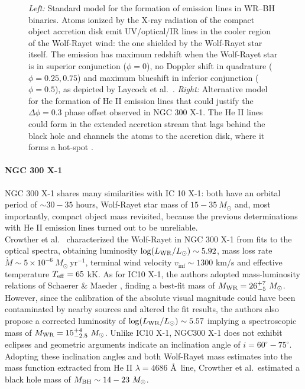 \documentclass[a4paper,titlepage]{book}     	%
\newcommand{\sun}{\ensuremath{_\odot}}
\newcommand{\mdot}{\ensuremath{\dot{M}}}
\newcommand{\msun}{\ensuremath{M\sun}}
\newcommand{\lsun}{L_{\odot}}
\newcommand{\yr}{\text{yr}}
\newcommand{\mwr}{\ensuremath{M_\textup{WR}}}
\newcommand{\mbh}{\ensuremath{M_\textup{BH}}}
\begin{document}
\begin{figure}[t!]
\begin{minipage}{.60\textwidth}
	\end{minipage}
	\caption{\emph{Left:} Standard model for the formation of emission lines in WR--BH binaries. Atoms ionized by the X-ray radiation of the compact object accretion disk emit UV/optical/IR lines in the cooler region of the Wolf-Rayet wind: the one shielded by the Wolf-Rayet star itself. The emission has maximum redshift when the Wolf-Rayet star is in superior conjunction ($\phi = 0$), no Doppler shift in quadrature ($\phi = 0.25,0.75$) and maximum blueshift in inferior conjunction ($\phi = 0.5$), as depicted by Laycock et al.\ \cite{ICX10X-1_Laycock2015_revisited}. \emph{Right:} Alternative model for the formation of He II emission lines that could justify the $\Delta \phi = 0.3$ phase offset observed in NGC 300 X-1. The He II lines could form in the extended accretion stream that lags behind the black hole and channels the atoms to the accretion disk, where it forms a hot-spot \cite{NGC300X-1_Binder2021_BHpreciso}.}\label{fig:WRBHwind}
\end{figure}


\paragraph{NGC 300 X-1} NGC 300 X-1 shares many similarities with IC 10 X-1: both have an orbital period of $\sim 30-35$ hours, Wolf-Rayet star mass of $15-35~\msun$ and, most importantly, compact object mass revisited, because the previous determinations with He II emission lines turned out to be unreliable.\\

Crowther et al.\ \cite{NGC300X-1_Crowther2010} characterized the Wolf-Rayet in NGC 300 X-1 from fits to the optical spectra, obtaining luminosity $\log(L_{\rm WR}/\lsun) \sim 5.92$, mass loss rate $\mdot \sim 5 \times 10^{-6}~\msun~\yr^{-1}$, terminal wind velocity $v_{\inf} \sim 1300$ km/s and effective temperature $T_{\rm eff} = 65$ kK. As for IC10 X-1, the authors adopted mass-luminosity relations of Schaerer \& Maeder \cite{schaerer1992MLrelationWR}, finding a best-fit mass of $\mwr = 26_{-5}^{+7}~\msun$. However, since the calibration of the absolute visual magnitude could have been contaminated by nearby sources and altered the fit results, the authors also propose a corrected luminosity of $\log(L_{\rm WR}/\lsun) \sim 5.57$ implying a spectroscopic mass of $\mwr = 15_{-2.5}^{+4}~\msun$. Unlike IC10 X-1, NGC300 X-1 does not exhibit eclipses and geometric arguments indicate an inclination angle of $i=60^{\circ}-75^{\circ}$. Adopting these inclination angles and both Wolf-Rayet mass estimates into the mass function extracted from He II $\lambda=4686$ \AA~line, Crowther et al.\ estimated a black hole mass of $
\mbh \sim 14-23~\msun$.\\
\end{document}
